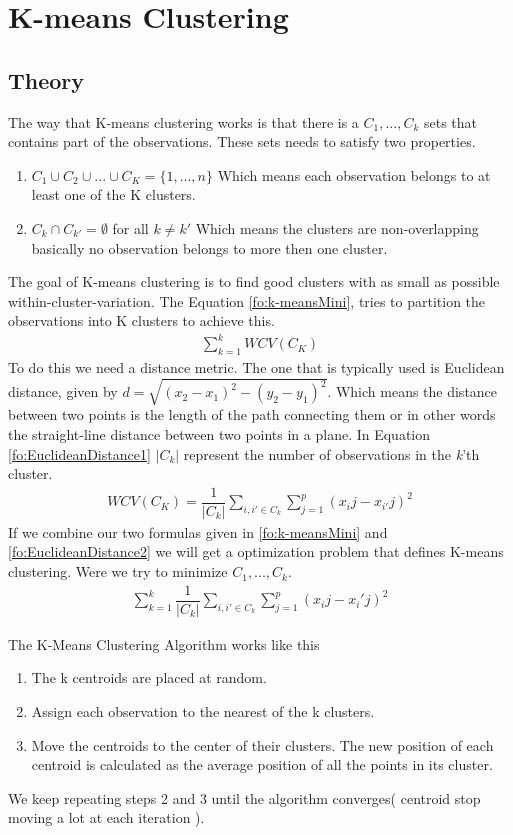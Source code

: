 \section{K-means Clustering}
\subsection{Theory}
The way that K-means clustering works is that there is a $C_1,...,C_k$ sets that contains part of the observations. These sets needs to satisfy two properties.
\begin{enumerate}
	\item $ C_1 \cup C_2 \cup ... \cup C_K = \{ 1,...,n \}$ Which means each observation belongs to at least one of the K clusters.
	\item $ C_k \cap C_{k'} = \emptyset $ for all $k \neq k'$ Which means the clusters are non-overlapping basically no observation belongs to more then one cluster.
\end{enumerate}

The goal of K-means clustering is to find good clusters with as small as possible within-cluster-variation. The Equation \ref{fo:k-meansMini}, tries to partition the observations into K clusters to achieve this.
\begin{align}\label{fo:k-meansMini}
\sum_{k=1}^{k} WCV(C_K)
\end{align}
To do this we need a distance metric. The one that is typically used is Euclidean distance, given by $d = \sqrt{ (x_2 - x_1)^2 - (y_2 - y_1)^2 } $. Which means the distance between two points is the length of the path connecting them or in other words the straight-line distance between two points in a plane. In Equation \ref{fo:EuclideanDistance1} $ |C_k| $ represent the number of observations in the \textit{k}'th cluster.
\begin{align}\label{fo:EuclideanDistance1}
WCV(C_K) = \dfrac{1}{|C_k|}  \sum_{i,i' \in C_k}   \sum_{j=1}^{p}(x_ij - x_{i'}j)^2
\end{align}
If we combine our two formulas given in \ref{fo:k-meansMini} and \ref{fo:EuclideanDistance2} we will get a optimization problem that defines K-means clustering. Were we try to minimize $ C_1,...,C_k $.
\begin{align}\label{fo:EuclideanDistance2}
\sum_{k=1}^{k} \dfrac{1}{|C_k|}  \sum_{i,i' \in C_k}   \sum_{j=1}^{p}(x_ij - x_i'j)^2
\end{align}

The K-Means Clustering Algorithm works like this
\begin{enumerate}
	\item The k centroids are placed at random.
	\item Assign each observation to the nearest of the k clusters.
	\item Move the centroids to the center of their clusters. The new position of each centroid is calculated as the average position of all the points in its cluster.
\end{enumerate}
We keep repeating steps 2 and 3 until the algorithm converges( centroid stop moving a lot at each iteration ).

